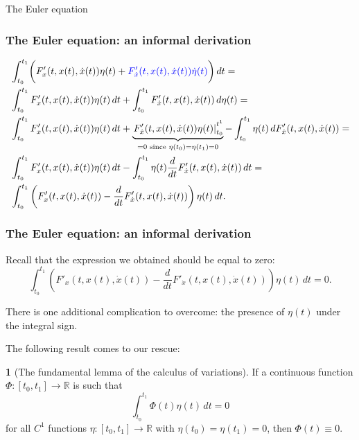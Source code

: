 \documentclass[10pt]{beamer}
\theoremstyle{definition}
\newtheorem{Fact}{\translate{Fact}}
\begin{document}
\begin{section}{The Euler equation}
\begin{frame}[fragile]

\end{frame}

\begin{frame}[fragile]
\frametitle{The Euler equation: an informal derivation}
\[\begin{split} 
& \int_{t_0}^{t_1}  \biggl( F'_x(t,x(t),\dot{x}(t))\eta(t) +  \textcolor{blue}{F'_{\dot{x}}(t,x(t),\dot{x}(t))\dot{\eta}(t)}\biggr)\,dt  = \\
& \int_{t_0}^{t_1} F'_x(t,x(t),\dot{x}(t))\eta(t)\,dt + \int_{t_0}^{t_1} F'_{\dot{x}}(t,x(t),\dot{x}(t))\,d\eta(t)=\\
& \int_{t_0}^{t_1} F'_x(t,x(t),\dot{x}(t))\eta(t)\,dt + \underbrace{\left. F'_{\dot{x}}(t,x(t),\dot{x}(t))\eta(t)\right|_{t_0}^{t^1}}_{=0 \text{ since } \eta(t_0)=\eta(t_1)=0 } - \int_{t_0}^{t_1} \eta(t) \,d  F'_{\dot{x}}(t,x(t),\dot{x}(t)) = \\
& \int_{t_0}^{t_1} F'_x(t,x(t),\dot{x}(t))\eta(t)\,dt -  \int_{t_0}^{t_1} \eta(t) \frac{d}{dt}F'_{\dot{x}}(t,x(t),\dot{x}(t))\,dt  =\\
& \int_{t_0}^{t_1} \left(F'_x(t,x(t),\dot{x}(t)) - \frac{d}{dt}F'_{\dot{x}}(t,x(t),\dot{x}(t)) \right)\eta(t)\,dt.
\end{split}\]
\end{frame}

\begin{frame}[fragile]
\frametitle{The Euler equation: an informal derivation}
Recall that the expression we obtained should be equal to zero:
\[ \int_{t_0}^{t_1} \left(F'_x(t,x(t),\dot{x}(t)) - \frac{d}{dt}F'_{\dot{x}}(t,x(t),\dot{x}(t)) \right)\eta(t)\,dt =0.\]

There is one additional complication to overcome: the presence of $ \eta(t) $ under the integral sign.\bigskip

The following result comes to our rescue:
\begin{Fact}[The fundamental lemma of the calculus of variations]
If a continuous function $ \Phi : [t_0,t_1]\rightarrow \mathbb{R} $ is such that \[ \int_{t_0}^{t_1} \Phi(t)\eta(t)\,dt = 0 \] for all $ C^1 $ functions $ \eta : [t_0,t_1]\rightarrow \mathbb{R} $ with $ \eta(t_0)=\eta(t_1)=0 $, then  $ \Phi(t) \equiv 0  $.
\label{fc:FLCV}
\end{Fact}
\end{frame}


\end{section}
\end{document}
